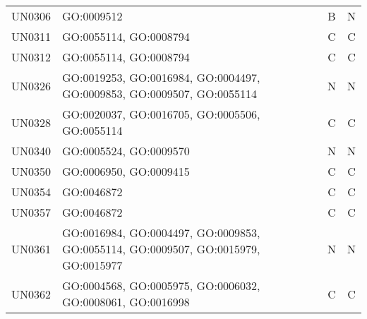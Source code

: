 \documentclass[11pt]{article}
\begin{document}
\begin{table}[t]
\begin{tabularx}{\textwidth}{lXcc}
UN0306 & GO:0009512                                                                                                                                                                      & B   & N \\
UN0311 & GO:0055114, GO:0008794                                                                                                                                                           & C   & C \\
UN0312 & GO:0055114, GO:0008794                                                                                                                                                           & C   & C \\
UN0326 & GO:0019253, GO:0016984, GO:0004497, GO:0009853, GO:0009507, GO:0055114                                                                                                               & N   & N \\
UN0328 & GO:0020037, GO:0016705, GO:0005506, GO:0055114                                                                                                                                     & C   & C \\
UN0340 & GO:0005524, GO:0009570                                                                                                                                                           & N   & N \\
UN0350 & GO:0006950, GO:0009415                                                                                                                                                           & C   & C \\
UN0354 & GO:0046872                                                                                                                                                                      & C   & C \\
UN0357 & GO:0046872                                                                                                                                                                      & C   & C \\
UN0361 & GO:0016984, GO:0004497, GO:0009853, GO:0055114, GO:0009507, GO:0015979, GO:0015977                                                                                                    & N   & N \\
UN0362 & GO:0004568, GO:0005975, GO:0006032, GO:0008061, GO:0016998                                                                                                                          & C   & C \\

\end{tabularx}
\end{table}
\end{document}
